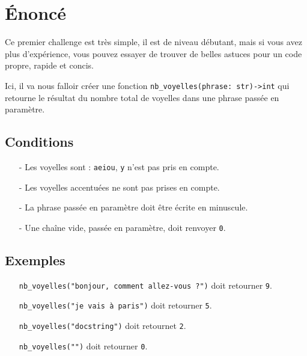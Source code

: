 \documentclass[a4paper,12pt]{book}
\begin{document}
\section{Énoncé}
\medskip

Ce premier challenge est très simple, il est de niveau \og débutant\fg{}, mais si vous avez plus d'expérience, vous pouvez essayer de trouver de belles astuces pour un code propre, rapide et concis.
\medskip

Ici, il va nous falloir créer une fonction \verb|nb_voyelles(phrase: str)->int| qui retourne le résultat du nombre total de voyelles dans une phrase passée en paramètre.
\medskip

\subsection*{Conditions}
\begin{itemize}
	\item[-] Les voyelles sont : \texttt{aeiou}, \texttt{y} n’est pas pris en compte.
	\item[-] Les voyelles accentuées ne sont pas prises en compte.
	\item[-] La phrase passée en paramètre doit être écrite en minuscule.
	\item[-] Une chaîne vide, passée en paramètre, doit renvoyer \texttt{0}.
\end{itemize}
\medskip

\subsection*{Exemples}
\begin{itemize}
	\item[\textbullet] \verb|nb_voyelles("bonjour, comment allez-vous ?")| doit retourner \texttt{9}.
	\item[\textbullet] \verb|nb_voyelles("je vais à paris")| doit retourner \texttt{5}.
	\item[\textbullet] \verb|nb_voyelles("docstring")| doit retournet \texttt{2}.
	\item[\textbullet] \verb|nb_voyelles("")| doit retourner \texttt{0}.
\end{itemize}
\medskip
\end{document}
